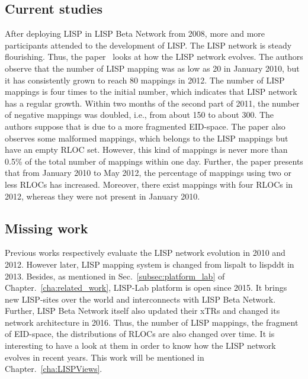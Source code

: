 \subsection{Current studies}
\label{subsec:evolution_studies}
After deploying LISP in LISP Beta Network from 2008, more and more participants attended to the development of LISP. The LISP network is steady flourishing. Thus, the paper~\cite{lispCCR} looks at how the LISP network evolves. The authors observe that the number of LISP mapping was as low as 20 in January 2010, but it has consistently grown to reach 80 mappings in 2012. The number of LISP mappings is four times to the initial number, which indicates that LISP network has a regular growth. Within two months of the second part of 2011, the number of negative mappings was doubled, i.e., from about 150 to about 300. The authors suppose that is due to a more fragmented EID-space. The paper also observes some malformed mappings, which belongs to the LISP mappings but have an empty RLOC set. However, this kind of mappings is never more than 0.5\% of the total number of mappings within one day. Further, the paper presents that from January 2010 to May 2012, the percentage of mappings using two or less RLOCs has increased. Moreover, there exist mappings with four RLOCs in 2012, whereas they were not present in January 2010.

\subsection{Missing work}
\label{subsec:evolution_missing}
Previous works respectively evaluate the LISP network evolution in 2010 and 2012. However later, LISP mapping system is changed from \acrshort{lispalt} to \acrshort{lispddt} in 2013. Besides, as mentioned in Sec.~\ref{subsec:platform_lab} of Chapter.~\ref{cha:related_work}, LISP-Lab platform is open since 2015. It brings new LISP-sites over the world and interconnects with LISP Beta Network. Further, LISP Beta Network itself also updated their xTRs and changed its network architecture in 2016. Thus, the number of LISP mappings, the fragment of EID-space, the distributions of RLOCs are also changed over time. It is interesting to have a look at them in order to know how the LISP network evolves in recent years. This work will be mentioned in Chapter.~\ref{cha:LISPViews}.

